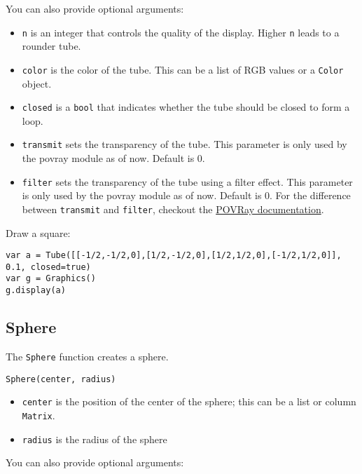 You can also provide optional arguments:

\begin{itemize}

\item
  \texttt{n} is an integer that controls the quality of the display.
  Higher \texttt{n} leads to a rounder tube.
\item
  \texttt{color} is the color of the tube. This can be a list of RGB
  values or a \texttt{Color} object.
\item
  \texttt{closed} is a \texttt{bool} that indicates whether the tube
  should be closed to form a loop.
\item
  \texttt{transmit} sets the transparency of the tube. This parameter is
  only used by the povray module as of now. Default is 0.
\item
  \texttt{filter} sets the transparency of the tube using a filter
  effect. This parameter is only used by the povray module as of now.
  Default is 0. For the difference between \texttt{transmit} and
  \texttt{filter}, checkout the
  \href{http://xahlee.info/3d/povray-glassy.html}{POVRay documentation}.
\end{itemize}

Draw a square:

\begin{lstlisting}
var a = Tube([[-1/2,-1/2,0],[1/2,-1/2,0],[1/2,1/2,0],[-1/2,1/2,0]], 0.1, closed=true)
var g = Graphics()
g.display(a)
\end{lstlisting}

\hypertarget{sphere}{%
\subsection{Sphere}\label{sphere}}

The \texttt{Sphere} function creates a sphere.

\begin{lstlisting}
Sphere(center, radius)
\end{lstlisting}

\begin{itemize}

\item
  \texttt{center} is the position of the center of the sphere; this can
  be a list or column \texttt{Matrix}.
\item
  \texttt{radius} is the radius of the sphere
\end{itemize}

You can also provide optional arguments:

